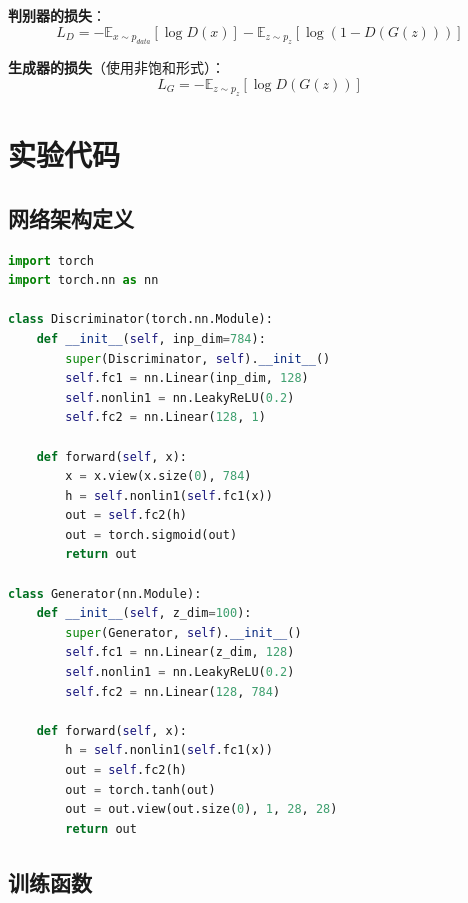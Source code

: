\documentclass[a4paper]{article}
\begin{document}
\textbf{判别器的损失}：
\begin{equation}
    L_D = -\mathbb{E}_{x \sim p_{data}}[\log D(x)] - \mathbb{E}_{z \sim p_z}[\log(1 - D(G(z)))]
\end{equation}

\textbf{生成器的损失}（使用非饱和形式）：
\begin{equation}
    L_G = -\mathbb{E}_{z \sim p_z}[\log D(G(z))]
\end{equation}

\section{实验代码}

\subsection{网络架构定义}

\begin{lstlisting}[title=判别器和生成器定义,frame=trbl,language={Python}]
import torch
import torch.nn as nn

class Discriminator(torch.nn.Module):
    def __init__(self, inp_dim=784):
        super(Discriminator, self).__init__()
        self.fc1 = nn.Linear(inp_dim, 128)
        self.nonlin1 = nn.LeakyReLU(0.2)
        self.fc2 = nn.Linear(128, 1)

    def forward(self, x):
        x = x.view(x.size(0), 784)
        h = self.nonlin1(self.fc1(x))
        out = self.fc2(h)
        out = torch.sigmoid(out)
        return out

class Generator(nn.Module):
    def __init__(self, z_dim=100):
        super(Generator, self).__init__()
        self.fc1 = nn.Linear(z_dim, 128)
        self.nonlin1 = nn.LeakyReLU(0.2)
        self.fc2 = nn.Linear(128, 784)

    def forward(self, x):
        h = self.nonlin1(self.fc1(x))
        out = self.fc2(h)
        out = torch.tanh(out)
        out = out.view(out.size(0), 1, 28, 28)
        return out
\end{lstlisting}

\subsection{训练函数}
\end{document}
